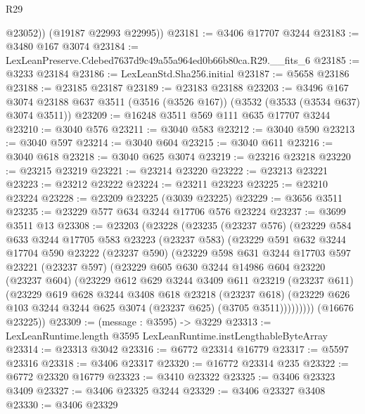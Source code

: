 \begin{lexlean}{R29}
\begin{coremodule}
          @23052))
      (@19187 @22993 @22995))
@23181 := @3406 @17707 @3244
@23183 := @3480 @167 @3074
@23184 := LexLeanPreserve.Cdebed7637d9c49a55a964ed0b66b80ca.R29.__fits_6
@23185 := @3233 @23184
@23186 := LexLeanStd.Sha256.initial
@23187 := @5658 @23186
@23188 := @23185 @23187
@23189 := @23183 @23188
@23203 := @3496
    @167
    @3074
    @23188
    @637
    @3511
    (@3516 (@3526 @167))
    (@3532 (@3533 (@3534 @637) @3074 @3511))
@23209 := @16248 @3511 @569 @111 @635 @17707 @3244
@23210 := @3040 @576
@23211 := @3040 @583
@23212 := @3040 @590
@23213 := @3040 @597
@23214 := @3040 @604
@23215 := @3040 @611
@23216 := @3040 @618
@23218 := @3040 @625 @3074
@23219 := @23216 @23218
@23220 := @23215 @23219
@23221 := @23214 @23220
@23222 := @23213 @23221
@23223 := @23212 @23222
@23224 := @23211 @23223
@23225 := @23210 @23224
@23228 := @23209 @23225 (@3039 @23225)
@23229 := @3656 @3511
@23235 := @23229 @577 @634 @3244 @17706 @576 @23224
@23237 := @3699 @3511 @13
@23308 := @23203
    (@23228
      (@23235
        (@23237 @576)
        (@23229
          @584
          @633
          @3244
          @17705
          @583
          @23223
          (@23237 @583)
          (@23229
            @591
            @632
            @3244
            @17704
            @590
            @23222
            (@23237 @590)
            (@23229
              @598
              @631
              @3244
              @17703
              @597
              @23221
              (@23237 @597)
              (@23229
                @605
                @630
                @3244
                @14986
                @604
                @23220
                (@23237 @604)
                (@23229
                  @612
                  @629
                  @3244
                  @3409
                  @611
                  @23219
                  (@23237 @611)
                  (@23229
                    @619
                    @628
                    @3244
                    @3408
                    @618
                    @23218
                    (@23237 @618)
                    (@23229 @626 @103 @3244 @3244 @625 @3074 (@23237 @625) (@3705 @3511)))))))))
      (@16676 @23225))
@23309 := (message : @3595) -> @3229
@23313 := LexLeanRuntime.length @3595 LexLeanRuntime.instLengthableByteArray
@23314 := @23313 @3042
@23316 := @6772 @23314 @16779
@23317 := @5597 @23316
@23318 := @3406 @23317
@23320 := @16772 @23314 @235
@23322 := @6772 @23320 @16779
@23323 := @3410 @23322
@23325 := @3406 @23323 @3409
@23327 := @3406 @23325 @3244
@23329 := @3406 @23327 @3408
@23330 := @3406 @23329

\end{coremodule}
\end{lexlean}
